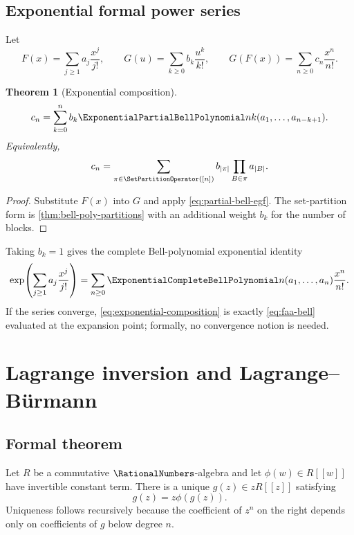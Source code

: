 \documentclass[11pt,a4paper,oneside,openany]{book}
\newtheorem{theorem}{Theorem}[chapter]
\theoremstyle{definition}
\theoremstyle{remark}
\begin{document}
\section{Exponential formal power series}
Let
\[
 F(x)=\sum_{j\ge1}a_j\frac{x^j}{j!},\qquad
 G(u)=\sum_{k\ge0}b_k\frac{u^k}{k!},\qquad
 G(F(x))=\sum_{n\ge0}c_n\frac{x^n}{n!}.
\]
\begin{theorem}[Exponential composition]\label{thm:exponential-composition}
\begin{equation}\label{eq:exponential-composition}
 c_n=\sum_{k=0}^{n}b_k\ExponentialPartialBellPolynomial nk(a_1,\ldots,a_{n-k+1}).
\end{equation}
Equivalently,
\begin{equation}\label{eq:exponential-composition-partitions}
 c_n=\sum_{\pi\in\SetPartitionOperator([n])}b_{|\pi|}\prod_{B\in\pi}a_{|B|}.
\end{equation}
\end{theorem}
\begin{proof}
Substitute $F(x)$ into $G$ and apply
\eqref{eq:partial-bell-egf}.  The set-partition form is
\cref{thm:bell-poly-partitions} with an additional weight $b_k$ for the number of
blocks.
\end{proof}

Taking $b_k=1$ gives the complete Bell-polynomial exponential identity
\begin{equation}\label{eq:exp-complete-bell-again}
 \exp\!\left(\sum_{j\ge1}a_j\frac{x^j}{j!}\right)
 =\sum_{n\ge0}\ExponentialCompleteBellPolynomial n(a_1,\ldots,a_n)\frac{x^n}{n!}.
\end{equation}
If the series converge, \eqref{eq:exponential-composition} is exactly
\eqref{eq:faa-bell} evaluated at the expansion point; formally, no convergence
notion is needed.

\chapter{Lagrange inversion and Lagrange--Bürmann}

\section{Formal theorem}
Let $R$ be a commutative $\RationalNumbers$-algebra and let $\phi(w)\in R[[w]]$ have invertible
constant term.  There is a unique $g(z)\in zR[[z]]$ satisfying
\begin{equation}\label{eq:lagrange-functional}
 g(z)=z\phi(g(z)).
\end{equation}
Uniqueness follows recursively because the coefficient of $z^n$ on the right
depends only on coefficients of $g$ below degree $n$.
\end{document}
